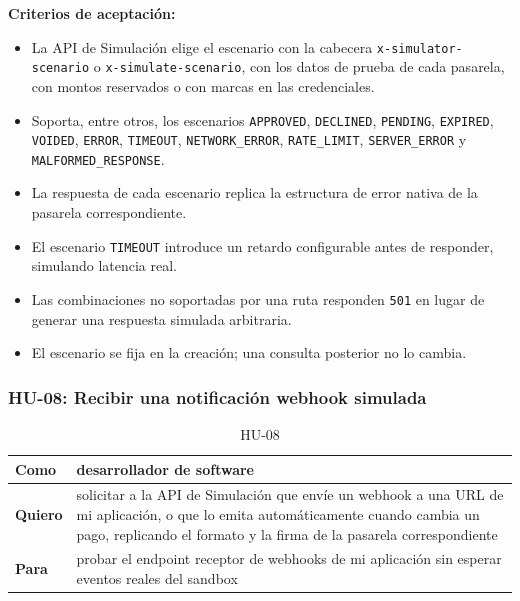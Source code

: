 \textbf{Criterios de aceptación:}
\begin{itemize}
  \item La API de Simulación elige el escenario con la cabecera \texttt{x-simulator-scenario} o \texttt{x-simulate-scenario}, con los datos de prueba de cada pasarela, con montos reservados o con marcas en las credenciales.
  \item Soporta, entre otros, los escenarios \texttt{APPROVED}, \texttt{DECLINED}, \texttt{PENDING}, \texttt{EXPIRED}, \texttt{VOIDED}, \texttt{ERROR}, \texttt{TIMEOUT}, \texttt{NETWORK\_ERROR}, \texttt{RATE\_LIMIT}, \texttt{SERVER\_ERROR} y \texttt{MALFORMED\_RESPONSE}.
  \item La respuesta de cada escenario replica la estructura de error nativa de la pasarela correspondiente.
  \item El escenario \texttt{TIMEOUT} introduce un retardo configurable antes de responder, simulando latencia real.
  \item Las combinaciones no soportadas por una ruta responden \texttt{501} en lugar de generar una respuesta simulada arbitraria.
  \item El escenario se fija en la creación; una consulta posterior no lo cambia.
\end{itemize}

\subsubsection{HU-08: Recibir una notificación webhook simulada}
\begin{table}[H]
  \centering
  \renewcommand{\arraystretch}{1.2}
  \begin{tabularx}{\textwidth}{|l|X|}
    \hline
    \textbf{Como} & desarrollador de software \\
    \hline
    \textbf{Quiero} & solicitar a la API de Simulación que envíe un webhook a una URL de mi aplicación, o que lo emita automáticamente cuando cambia un pago, replicando el formato y la firma de la pasarela correspondiente \\
    \hline
    \textbf{Para} & probar el endpoint receptor de webhooks de mi aplicación sin esperar eventos reales del sandbox \\
    \hline
  \end{tabularx}
  \caption{HU-08}
  \label{tab:hu-08}
\end{table}

